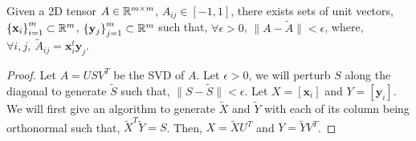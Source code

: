\begin{proposition}
\label{theory:prop1}
Given a 2D tensor $A\in \mathbb{R}^{m\times m}$, $A_{ij} \in [-1,1]$, there exists sets of unit vectors, $\left\{\mathbf{x}_i\right\}_{i=1}^m\subset \mathbb{R}^m$, $\left\{\mathbf{y}_j\right\}_{j=1}^m\subset \mathbb{R}^m$ such that, $\forall \epsilon > 0$, $\|A - \widetilde{A}\| < \epsilon$, where, $\forall i,j,\: \widetilde{A}_{ij}=\mathbf{x}_i^t\mathbf{y}_j$.
\end{proposition}
\begin{proof}
  Let $A=USV^T$ be the SVD of $A$. Let $\epsilon > 0$, we will perturb $S$ along the diagonal to generate $\widetilde{S}$ such that, $\|S - \widetilde{S}\| < \epsilon$. Let $X=\left[\mathbf{x}_i\right]$ and $Y=\left[\mathbf{y}_i\right]$. We will first give an algorithm to generate $\widetilde{X}$ and $\widetilde{Y}$ with each
  of its column being orthonormal such that, $\widetilde{X}^T\widetilde{Y}=S$. Then, $X=\widetilde{X}U^T$ and $Y=\widetilde{Y}V^T$. 


\end{proof}
